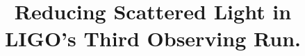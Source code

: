 \documentclass[12pt]{iopart}
\begin{document}






\title{Reducing Scattered Light in LIGO's Third Observing Run.}






\end{document}
